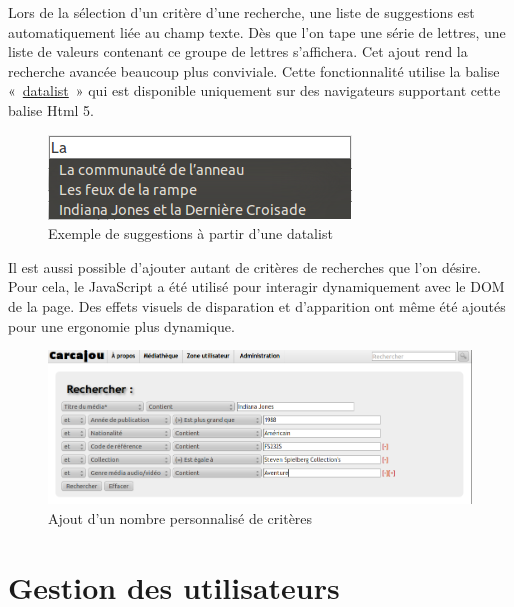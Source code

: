 \documentclass[letter, 11pt]{report}
\begin{document}
Lors de la sélection d'un critère d'une recherche, une liste de suggestions est automatiquement liée au champ texte. Dès que l'on tape une série de lettres, une liste de valeurs contenant ce groupe de lettres s'affichera.  Cet ajout rend la recherche avancée beaucoup plus conviviale. Cette fonctionnalité utilise la balise «~\href{http://www.w3schools.com/html5/tag_datalist.asp}{datalist}~» qui est disponible uniquement sur des navigateurs supportant cette balise Html 5.

\begin{figure}[htbp]
	\begin{center}
		\includegraphics[scale=0.5]{exempleDatalist.png}
	\end{center}
	\caption{Exemple de suggestions à partir d'une datalist}
\end{figure}

Il est aussi possible d'ajouter autant de critères de recherches que l'on désire. Pour cela, le JavaScript a été utilisé pour interagir dynamiquement avec le DOM de la page. Des effets visuels de disparation et d'apparition ont même été ajoutés pour une ergonomie plus dynamique.

\begin{figure}[htbp]
	\begin{center}
		\includegraphics[scale=0.5]{captures_ecran/exemple_recherche_avancee2.png}
	\end{center}
	\caption{Ajout d'un nombre personnalisé de critères}
\end{figure}

\section{Gestion des utilisateurs}
\end{document}
